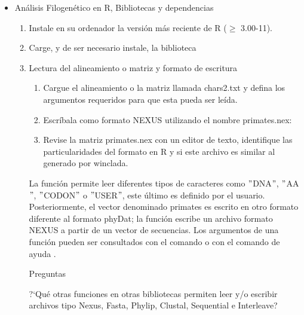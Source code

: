 \begin{itemize}
\begin{enumerate}
\end{enumerate}

  
\item An\'alisis Filogen\'etico en R, Bibliotecas y dependencias

\begin{enumerate}
  \item Instale en su ordenador la versi\'on m\'as reciente de R ($\ge$ 3.00-11). 
  \item Carge, y de ser necesario instale,  la biblioteca 
  \item{Lectura del alineamiento o matriz y formato de escritura}
  \begin{enumerate}
    \item   Cargue el alineamiento o la matriz llamada chars2.txt  y defina los argumentos requeridos para que esta pueda ser le\'ida. 
    \item Escr\'ibala como formato NEXUS utilizando el nombre primates.nex:
    \item Revise la matriz primates.nex con un editor de texto,  identifique las particularidades del formato en R y si este archivo es similar al generado por winclada.
  \end{enumerate}


La funci\'on  permite leer diferentes tipos de caracteres como $"$DNA$"$,  $"$AA$"$,  $"$CODON$"$ o $"$USER$"$,  este \'ultimo es definido por el usuario. Posteriormente, el vector denominado primates es escrito en otro formato diferente al formato phyDat; la función  escribe un archivo formato NEXUS a partir de un vector de secuencias. Los argumentos de una función pueden ser consultados con el comando   o con el comando de ayuda .



{Preguntas}

?`Qu\'e otras funciones en otras bibliotecas permiten leer y/o escribir archivos tipo Nexus,  Fasta,  Phylip,  Clustal,  Sequential e Interleave?\\


\end{enumerate}
\end{itemize}
